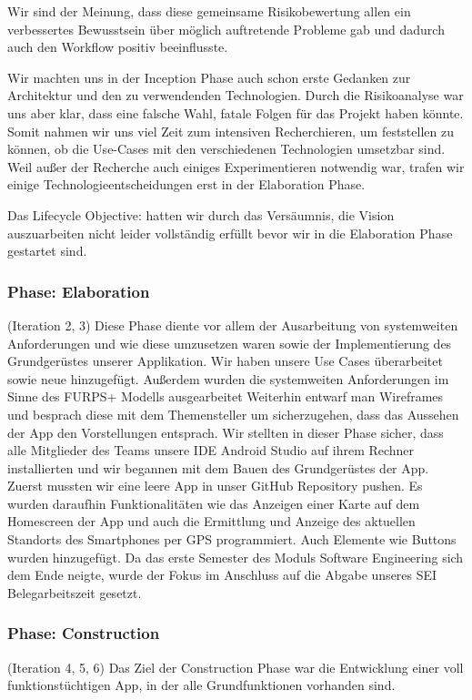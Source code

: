 \documentclass[10pt]{article}
\begin{document}
Wir sind der Meinung, dass diese gemeinsame Risikobewertung allen
ein verbessertes Bewusstsein über möglich auftretende Probleme gab und dadurch auch den Workflow positiv beeinflusste.\par
\medskip
Wir machten uns in der Inception Phase auch schon erste Gedanken zur Architektur und den zu verwendenden Technologien.
Durch die Risikoanalyse war uns aber klar, dass eine falsche Wahl, fatale Folgen für das Projekt haben könnte.
Somit nahmen wir uns viel Zeit zum intensiven Recherchieren, um feststellen zu können, ob die Use-Cases mit den
verschiedenen Technologien umsetzbar sind. Weil außer der Recherche auch einiges Experimentieren notwendig war,
trafen wir einige Technologieentscheidungen erst in der Elaboration Phase.\par
\medskip
Das Lifecycle Objective:  hatten wir durch das Versäumnis, die Vision
auszuarbeiten nicht leider vollständig erfüllt bevor wir in die Elaboration Phase gestartet sind.

\subsubsection{Phase: Elaboration}
(Iteration 2, 3)
Diese Phase diente vor allem der Ausarbeitung von systemweiten Anforderungen und wie diese umzusetzen waren sowie der Implementierung des Grundgerüstes unserer Applikation.
Wir haben unsere Use Cases überarbeitet sowie neue hinzugefügt. Außerdem wurden die systemweiten Anforderungen im Sinne des FURPS+ Modells ausgearbeitet
Weiterhin entwarf man Wireframes und besprach diese mit dem Themensteller um sicherzugehen, dass das Aussehen
der App den Vorstellungen entsprach. Wir stellten in dieser Phase sicher, dass alle Mitglieder des Teams unsere IDE Android Studio auf ihrem
Rechner installierten und wir begannen mit dem Bauen des Grundgerüstes der App. Zuerst mussten wir eine leere App in unser GitHub Repository pushen. Es wurden daraufhin
Funktionalitäten wie das Anzeigen einer Karte auf dem Homescreen der App und auch die Ermittlung und Anzeige des aktuellen Standorts des Smartphones per GPS programmiert. Auch
Elemente wie Buttons wurden hinzugefügt. Da das erste Semester des Moduls Software Engineering sich dem Ende neigte, wurde der Fokus im Anschluss auf die Abgabe unseres SEI Belegarbeitszeit
gesetzt.
\subsubsection{Phase: Construction}
(Iteration 4, 5, 6)
Das Ziel der Construction Phase war die Entwicklung einer voll funktionstüchtigen App, in der alle Grundfunktionen vorhanden sind.
\end{document}
